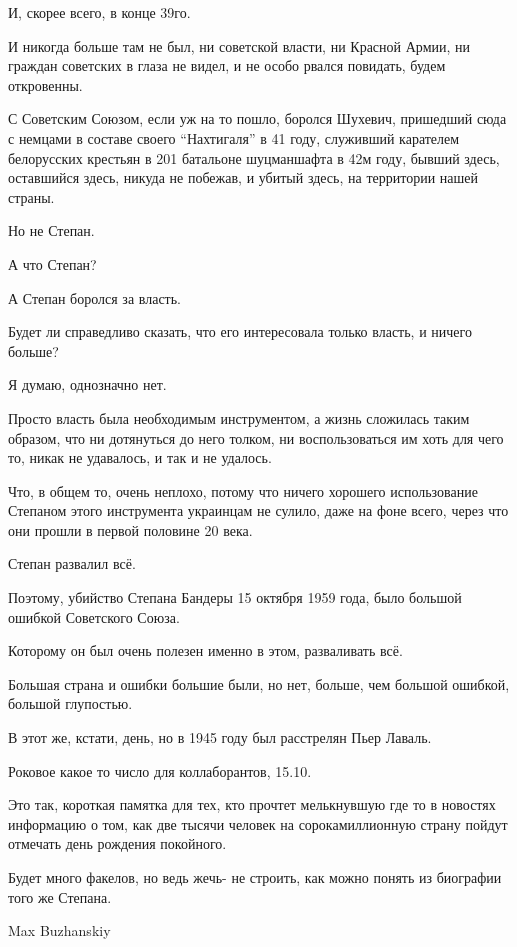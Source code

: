 И, скорее всего, в конце 39го.

И никогда больше там не был, ни советской власти, ни Красной Армии, ни граждан
советских в глаза не видел, и не особо рвался повидать, будем откровенны.

С Советским Союзом, если уж на то пошло, боролся Шухевич, пришедший сюда с
немцами в составе своего \enquote{Нахтигаля} в 41 году, служивший карателем белорусских
крестьян в 201 батальоне шуцманшафта в 42м году, бывший здесь, оставшийся
здесь, никуда не побежав, и убитый здесь, на территории нашей страны.

Но не Степан.

А что Степан?

А Степан боролся за власть.

Будет ли справедливо сказать, что его интересовала только власть, и ничего
больше?

Я думаю, однозначно нет.

Просто власть была необходимым инструментом, а жизнь сложилась таким образом,
что ни дотянуться до него толком, ни воспользоваться им хоть для чего то, никак
не удавалось, и так и не удалось.

Что, в общем то, очень неплохо, потому что ничего хорошего использование
Степаном этого инструмента украинцам не сулило, даже на фоне всего, через что
они прошли в первой половине 20 века.

Степан развалил всё.

Поэтому, убийство Степана Бандеры 15 октября 1959 года, было большой ошибкой
Советского Союза.

Которому он был очень полезен именно в этом, разваливать всё.

Большая страна и ошибки большие были, но нет, больше, чем большой ошибкой,
большой глупостью.

В этот же, кстати, день, но в 1945 году был расстрелян Пьер Лаваль.

Роковое какое то число для коллаборантов, 15.10.

Это так, короткая памятка для тех, кто прочтет мелькнувшую где то в новостях
информацию о том, как две тысячи человек на сорокамиллионную страну пойдут
отмечать день рождения покойного.

Будет много факелов, но ведь жечь- не строить, как можно понять из биографии
того же Степана.

Max Buzhanskiy
